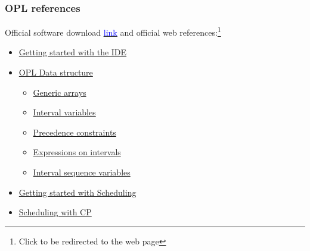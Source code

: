 \begin{frame} \frametitle{OPL references}

Official software download \href{https://developer.ibm.com/academic/resources/data-analytics}{\underline{\textcolor{blue}{link}}} and official web references:\footnote{Click to be redirected to the web page}

\begin{itemize}
\item \href{http://www.ibm.com/support/knowledgecenter/SSSA5P_12.7.1/ilog.odms.ide.help/OPL_Studio/gsoplide/topics/opl_ide_gettingstarted_TOC.html?lang=en}{Getting started with the IDE}
\item \href{http://www.ibm.com/support/knowledgecenter/SSSA5P_12.7.1/ilog.odms.ide.help/OPL_Studio/opllangref/topics/opl_langref_datastructures.html?lang=en}{OPL Data structure}
\begin{itemize}
\item \href{http://www.ibm.com/support/knowledgecenter/SSSA5P_12.7.1/ilog.odms.ide.help/OPL_Studio/opllangref/topics/opl_langref_data_init_arrays.html?lang=en}{Generic arrays}
\item \href{http://www.ibm.com/support/knowledgecenter/SSSA5P_12.7.1/ilog.odms.ide.help/OPL_Studio/opllangref/topics/opl_langref_scheduling_interval.html?lang=en}{Interval variables}
\item \href{http://www.ibm.com/support/knowledgecenter/SSSA5P_12.7.1/ilog.odms.ide.help/OPL_Studio/opllangref/topics/opl_langref_scheduling_precedence.html?lang=en}{Precedence constraints}
\item \href{http://www.ibm.com/support/knowledgecenter/SSSA5P_12.7.1/ilog.odms.ide.help/OPL_Studio/opllangref/topics/opl_langref_scheduling_expressions.html?lang=en}{Expressions on intervals}
\item \href{http://www.ibm.com/support/knowledgecenter/SSSA5P_12.7.1/ilog.odms.ide.help/OPL_Studio/opllangref/topics/opl_langref_scheduling_sequence.html?lang=en}{Interval sequence variables}
\end{itemize}
\item \href{http://www.ibm.com/support/knowledgecenter/SSSA5P_12.7.1/ilog.odms.ide.help/OPL_Studio/scheduling_gs/topics/opl_gs_scheduling.html?lang=en}{Getting started with Scheduling}
\item \href{http://www.ibm.com/support/knowledgecenter/SSSA5P_12.7.1/ilog.odms.ide.help/OPL_Studio/opllangref/topics/opl_langref_scheduling.html?lang=en}{Scheduling with CP}
\end{itemize}
 
\end{frame}


